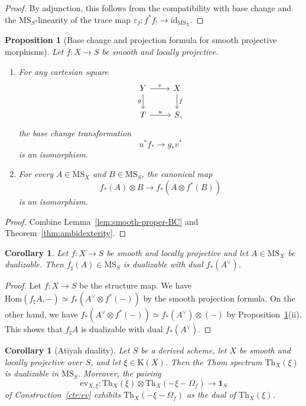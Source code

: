\documentclass{amsart}
\numberwithin{equation}{section}
\theoremstyle{plain}
\newtheorem{proposition}[equation]{Proposition}
\newtheorem{corollary}[equation]{Corollary}
\theoremstyle{definition}
\def\1{\mathbf 1}
\def\ph{\mathord-}
\def\id{\mathrm{id}}
\def\Hom{\mathrm{Hom}}
\def\Th{\mathrm{Th}}
\def\K{\mathrm{K}{}}
\def\MS{\mathrm{MS}}
\def\ev{\mathrm{ev}}
\let\epsilon=\varepsilon
\begin{document}
\begin{proof}
	By adjunction, this follows from the compatibility with base change and the $\MS_S$-linearity of the trace map $\epsilon_f\colon f^*f_!\to\id_{\MS_X}$.
\end{proof}

\begin{proposition}[Base change and projection formula for smooth projective morphisms]
	\label{prop:smooth-proper-BC}
	Let $f\colon X\to S$ be smooth and locally projective.
	\begin{enumerate}
		\item For any cartesian square
		\[
		\begin{tikzcd}
			Y \ar{r}{v} \ar{d}[swap]{g} & X \ar{d}{f} \\
			T \ar{r}{u} & S\rlap,
		\end{tikzcd}
		\]
		the base change transformation
		\[
		u^*f_*\to g_* v^*
		\]
		is an isomorphism.
		\item For every $A\in \MS_X$ and $B\in \MS_S$, the canonical map
		\[
		f_*(A)\otimes B\to f_*(A\otimes f^*(B))
		\]
		is an isomorphism.
	\end{enumerate}
\end{proposition}

\begin{proof}
	Combine Lemma~\ref{lem:smooth-proper-BC} and Theorem~\ref{thm:ambidexterity}.
\end{proof}

\begin{corollary}\label{cor:dualizable-pf}
	Let $f\colon X\to S$ be smooth and locally projective and let $A\in \MS_X$ be dualizable. Then $f_\sharp(A)\in \MS_S$ is dualizable with dual $f_*(A^\vee)$.
\end{corollary}

\begin{proof}
	Let $f\colon X\to S$ be the structure map. We have $\Hom(f_\sharp A,\ph)\simeq f_*(A^\vee\otimes f^*(\ph))$ by the smooth projection formula. On the other hand, we have $f_*(A^\vee\otimes f^*(\ph))\simeq f_*(A^\vee)\otimes (\ph)$ by Proposition~\ref{prop:smooth-proper-BC}(ii). This shows that $f_\sharp A$ is dualizable with dual $f_*(A^\vee)$.
\end{proof}

\begin{corollary}[Atiyah duality]
	\label{cor:atiyah}
	Let $S$ be a derived scheme, let $X$ be smooth and locally projective over $S$, and let $\xi\in\K(X)$.
	Then the Thom spectrum $\Th_X(\xi)$ is dualizable in $\MS_S$. Moreover, the pairing
	\[
	\ev_{X,\xi}\colon \Th_X(\xi)\otimes \Th_X(-\xi-\Omega_f) \to \1_S
	\]
	of Construction~\ref{ctr:ev} exhibits $\Th_X(-\xi-\Omega_f)$ as the dual of $\Th_X(\xi)$. 
\end{corollary}
\end{document}
